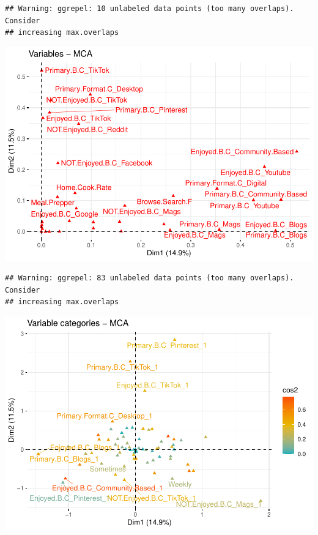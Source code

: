 \documentclass[
]{article}
\newenvironment{Shaded}{\begin{snugshade}}{\end{snugshade}}
\newcommand{\DataTypeTok}[1]{\textcolor[rgb]{0.13,0.29,0.53}{#1}}
\newcommand{\KeywordTok}[1]{\textcolor[rgb]{0.13,0.29,0.53}{\textbf{#1}}}
\newcommand{\NormalTok}[1]{#1}
\newcommand{\OtherTok}[1]{\textcolor[rgb]{0.56,0.35,0.01}{#1}}
\newcommand{\StringTok}[1]{\textcolor[rgb]{0.31,0.60,0.02}{#1}}
\begin{document}
\begin{verbatim}
## Warning: ggrepel: 10 unlabeled data points (too many overlaps). Consider
## increasing max.overlaps
\end{verbatim}

\includegraphics{Average-User-MCA_files/figure-latex/diet no browse-2.pdf}

\begin{Shaded}
\end{Shaded}

\begin{verbatim}
## Warning: ggrepel: 83 unlabeled data points (too many overlaps). Consider
## increasing max.overlaps
\end{verbatim}

\includegraphics{Average-User-MCA_files/figure-latex/diet no browse-3.pdf}
\end{document}
